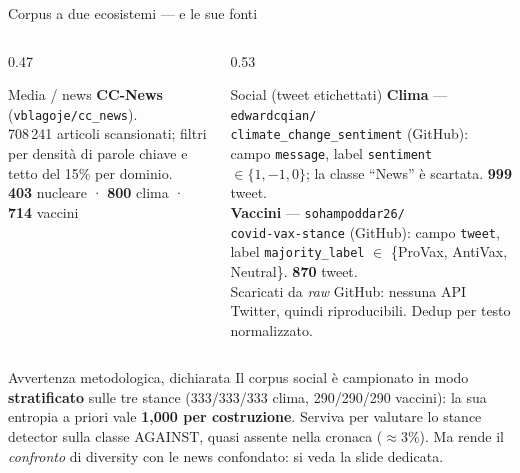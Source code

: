 \documentclass[aspectratio=169,11pt]{beamer}
\begin{document}
\begin{frame}{Corpus a due ecosistemi --- e le sue fonti}
  \begin{columns}[T]
    \begin{column}{0.47\textwidth}
      \begin{block}{Media / news}
        \scriptsize
        \textbf{CC-News} (\texttt{vblagoje/cc\_news}).\\
        708\,241 articoli scansionati; filtri per densità di parole chiave e tetto
        del 15\% per dominio.\\[0.3em]
        \textbf{403} nucleare · \textbf{800} clima · \textbf{714} vaccini
      \end{block}
    \end{column}
    \begin{column}{0.53\textwidth}
      \begin{block}{Social (tweet etichettati)}
        \scriptsize
        \textbf{Clima} --- \texttt{edwardcqian/}\\\texttt{climate\_change\_sentiment} (GitHub):
        campo \texttt{message}, label \texttt{sentiment} $\in\{1,-1,0\}$; la classe
        ``News'' è scartata. \textbf{999} tweet.\\[0.4em]
        \textbf{Vaccini} --- \texttt{sohampoddar26/}\\\texttt{covid-vax-stance} (GitHub):
        campo \texttt{tweet}, label \texttt{majority\_label} $\in$
        \{ProVax, AntiVax, Neutral\}. \textbf{870} tweet.\\[0.4em]
        Scaricati da \emph{raw} GitHub: \alert{nessuna API Twitter}, quindi
        riproducibili. Dedup per testo normalizzato.
      \end{block}
    \end{column}
  \end{columns}
  \vspace{0.4em}
  \begin{block}{\small Avvertenza metodologica, dichiarata}
    \scriptsize
    Il corpus social è campionato in modo \textbf{stratificato} sulle tre stance
    (333/333/333 clima, 290/290/290 vaccini): la sua entropia a priori vale
    \textbf{1,000 per costruzione}. Serviva per valutare lo stance detector sulla classe
    AGAINST, quasi assente nella cronaca ($\approx$3\%). Ma rende il \emph{confronto} di
    diversity con le news confondato: si veda la slide dedicata.
  \end{block}
\end{frame}
\end{document}
